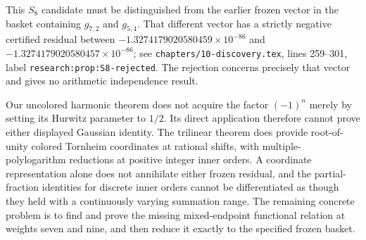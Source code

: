 This $S_8$ candidate must be distinguished from the earlier frozen vector
in the basket containing $g_{7,2}$ and $g_{5,4}$.  That different vector
has a strictly negative certified residual between
$-1.3274179020580459\times10^{-86}$ and
$-1.3274179020580457\times10^{-86}$; see
\nolinkurl{chapters/10-discovery.tex}, lines 259--301,
label \texttt{research:prop:S8-rejected}.
The rejection concerns precisely that vector and gives no arithmetic
independence result.

Our uncolored harmonic theorem does not acquire the factor $(-1)^n$
merely by setting its Hurwitz parameter to $1/2$.  Its direct application
therefore cannot prove either displayed Gaussian identity.  The
trilinear theorem does provide root-of-unity colored Tornheim
coordinates at rational shifts, with multiple-polylogarithm reductions
at positive integer inner orders.  A coordinate representation alone
does not annihilate either frozen residual, and the partial-fraction
identities for discrete inner orders cannot be differentiated as though
they held with a continuously varying summation range.  The remaining
concrete problem is to find and prove the missing mixed-endpoint
functional relation at weights seven and nine, and then reduce it
exactly to the specified frozen basket.
